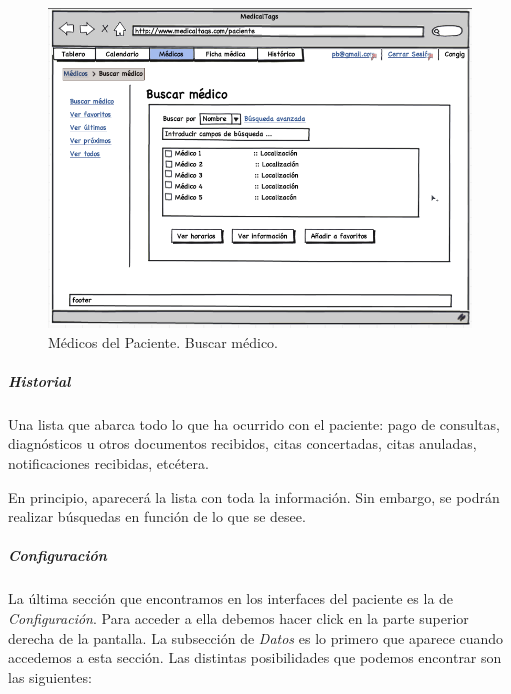 			\begin{figure}[H]
			  \centering
			    \includegraphics[width=12cm]{img/png/interfaz/28_Medicos_Paciente.png}
			  \caption{Médicos del Paciente. Buscar médico.}
			  \label{fig:iu_medico_paciente_buscar}
			\end{figure}
		
		
		\subparagraph{Historial} %
		\label{par:paciente_historial}
		
		Una lista que abarca todo lo que ha ocurrido con el paciente: pago de consultas, diagnósticos u otros documentos recibidos, citas concertadas, citas anuladas, notificaciones recibidas, etcétera. 
		
		En principio, aparecerá la lista con toda la información. Sin embargo, se podrán realizar búsquedas en función de lo que se desee.		
		
		
		\subparagraph{Configuración} %
		\label{par:paciente_configuracion}
		
			La última sección que encontramos en los interfaces del paciente es la de \textit{Configuración}. Para acceder a ella debemos hacer click en la parte superior derecha de la pantalla. La subsección de \textit{Datos} es lo primero que aparece cuando accedemos a esta sección. Las distintas posibilidades que podemos encontrar son las siguientes:

